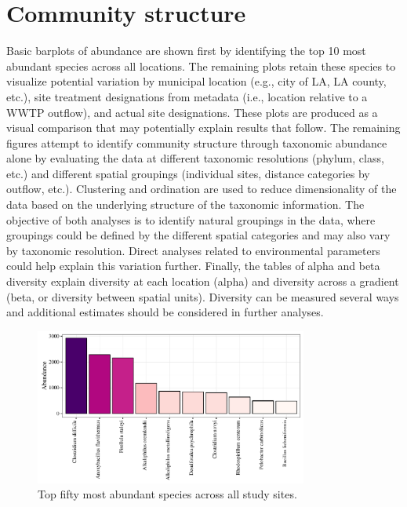 \documentclass[letterpaper,12pt]{article}\usepackage[]{graphicx}\usepackage[]{color}
\newenvironment{knitrout}{}{} %
\begin{document}
\section{Community structure}
Basic barplots of abundance are shown first by identifying the top 10 most abundant species across all locations.  The remaining plots retain these species to visualize potential variation by municipal location (e.g., city of LA, LA county, etc.), site treatment designations from metadata (i.e., location relative to a WWTP outflow), and actual site designations.  These plots are produced as a visual comparison that may potentially explain results that follow.  The remaining figures attempt to identify community structure through taxonomic abundance alone by evaluating the data at different taxonomic resolutions (phylum, class, etc.) and different spatial groupings (individual sites, distance categories by outflow, etc.).  Clustering and ordination are used to reduce dimensionality of the data based on the underlying structure of the taxonomic information.  The objective of both analyses is to identify natural groupings in the data, where groupings could be defined by the different spatial categories and may also vary by taxonomic resolution.  Direct analyses related to environmental parameters could help explain this variation further.  Finally, the tables of alpha and beta diversity explain diversity at each location (alpha) and diversity across a gradient (beta, or diversity between spatial units).  Diversity can be measured several ways and additional estimates should be considered in further analyses.    
\begin{knitrout}
\color{fgcolor}\begin{figure}[!ht]

{\centering \includegraphics[width=0.8\textwidth]{figs/abundall-1} 

}

\caption[Top fifty most abundant species across all study sites]{Top fifty most abundant species across all study sites.}\label{fig:abundall}
\end{figure}


\end{knitrout}
\end{document}
